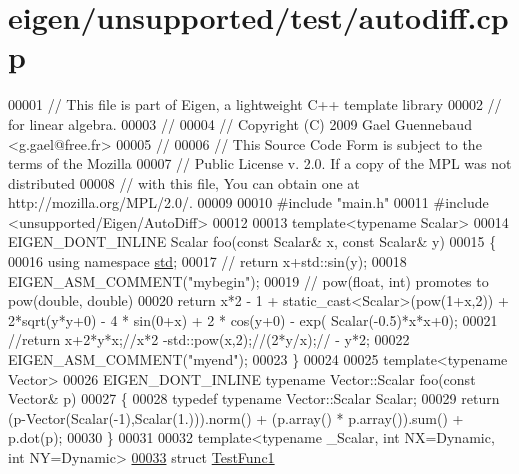 \hypertarget{eigen_2unsupported_2test_2autodiff_8cpp_source}{}\section{eigen/unsupported/test/autodiff.cpp}
\label{eigen_2unsupported_2test_2autodiff_8cpp_source}

\begin{DoxyCode}
00001 \textcolor{comment}{// This file is part of Eigen, a lightweight C++ template library}
00002 \textcolor{comment}{// for linear algebra.}
00003 \textcolor{comment}{//}
00004 \textcolor{comment}{// Copyright (C) 2009 Gael Guennebaud <g.gael@free.fr>}
00005 \textcolor{comment}{//}
00006 \textcolor{comment}{// This Source Code Form is subject to the terms of the Mozilla}
00007 \textcolor{comment}{// Public License v. 2.0. If a copy of the MPL was not distributed}
00008 \textcolor{comment}{// with this file, You can obtain one at http://mozilla.org/MPL/2.0/.}
00009 
00010 \textcolor{preprocessor}{#include "main.h"}
00011 \textcolor{preprocessor}{#include <unsupported/Eigen/AutoDiff>}
00012 
00013 \textcolor{keyword}{template}<\textcolor{keyword}{typename} Scalar>
00014 EIGEN\_DONT\_INLINE Scalar foo(\textcolor{keyword}{const} Scalar& x, \textcolor{keyword}{const} Scalar& y)
00015 \{
00016   \textcolor{keyword}{using namespace }\hyperlink{namespacestd}{std};
00017 \textcolor{comment}{//   return x+std::sin(y);}
00018   EIGEN\_ASM\_COMMENT(\textcolor{stringliteral}{"mybegin"});
00019   \textcolor{comment}{// pow(float, int) promotes to pow(double, double)}
00020   \textcolor{keywordflow}{return} x*2 - 1 + \textcolor{keyword}{static\_cast<}Scalar\textcolor{keyword}{>}(pow(1+x,2)) + 2*sqrt(y*y+0) - 4 * sin(0+x) + 2 * cos(y+0) - exp(
      Scalar(-0.5)*x*x+0);
00021   \textcolor{comment}{//return x+2*y*x;//x*2 -std::pow(x,2);//(2*y/x);// - y*2;}
00022   EIGEN\_ASM\_COMMENT(\textcolor{stringliteral}{"myend"});
00023 \}
00024 
00025 \textcolor{keyword}{template}<\textcolor{keyword}{typename} Vector>
00026 EIGEN\_DONT\_INLINE \textcolor{keyword}{typename} Vector::Scalar foo(\textcolor{keyword}{const} Vector& p)
00027 \{
00028   \textcolor{keyword}{typedef} \textcolor{keyword}{typename} Vector::Scalar Scalar;
00029   \textcolor{keywordflow}{return} (p-Vector(Scalar(-1),Scalar(1.))).norm() + (p.array() * p.array()).sum() + p.dot(p);
00030 \}
00031 
00032 \textcolor{keyword}{template}<\textcolor{keyword}{typename} \_Scalar, \textcolor{keywordtype}{int} NX=Dynamic, \textcolor{keywordtype}{int} NY=Dynamic>
\hyperlink{struct_test_func1}{00033} \textcolor{keyword}{struct }\hyperlink{struct_test_func1}{TestFunc1}

\end{DoxyCode}
